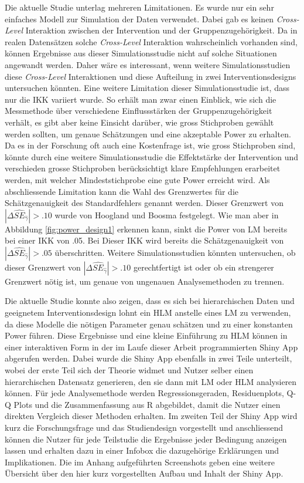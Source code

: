 \documentclass[12pt]{article}\usepackage[]{graphicx}\usepackage[]{color}
\begin{document}
Die aktuelle Studie unterlag mehreren Limitationen. Es wurde nur ein sehr einfaches Modell zur Simulation der Daten verwendet. Dabei gab es keinen \textit{Cross-Level} Interaktion zwischen der Intervention und der Gruppenzugehörigkeit. Da in realen Datensätzen solche \textit{Cross-Level} Interaktion wahrscheinlich vorhanden sind, können Ergebnisse aus dieser Simulationsstudie nicht auf solche Situationen angewandt werden. Daher wäre es interessant, wenn weitere Simulationsstudien diese \textit{Cross-Level} Interaktionen und diese Aufteilung in zwei Interventionsdesigns untersuchen könnten. Eine weitere Limitation dieser Simulationsstudie ist, dass nur die IKK variiert wurde. So erhält man zwar einen Einblick, wie sich die Messmethode über verschiedene Einflussstärken der Gruppenzugehörigkeit verhält, es gibt aber keine Einsicht darüber, wie gross Stichproben gewählt werden sollten, um genaue Schätzungen und eine akzeptable Power zu erhalten. Da es in der Forschung oft auch eine Kostenfrage ist, wie gross Stichproben sind, könnte durch eine weitere Simulationsstudie die Effektstärke der Intervention und verschieden grosse Stichproben berücksichtigt klare Empfehlungen erarbeitet werden, mit welcher Mindeststichprobe eine gute Power erreicht wird. Als abschliessende Limitation kann die Wahl des Grenzwertes für die Schätzgenauigkeit des Standardfehlers genannt werden. Dieser Grenzwert von $|\Delta\widehat{SE}_{\widehat{\gamma}}| > .10$ wurde von Hoogland und Boosma \citeyearpar{hooglandboosma1998robustness} festgelegt. Wie man aber in Abbildung \ref{fig:power_design1} erkennen kann, sinkt die Power von LM bereits bei einer IKK von .05. Bei Dieser IKK wird bereits die Schätzgenauigkeit von $|\Delta\widehat{SE}_{\widehat{\gamma}}| > .05$ überschritten. Weitere Simulationsstudien könnten untersuchen, ob dieser Grenzwert von $|\Delta\widehat{SE}_{\widehat{\gamma}}| > .10$ gerechtfertigt ist oder ob ein strengerer Grenzwert nötig ist, um genaue von ungenauen Analysemethoden zu trennen.

Die aktuelle Studie konnte also zeigen, dass es sich bei hierarchischen Daten und geeignetem Interventionsdesign lohnt ein HLM anstelle eines LM zu verwenden, da diese Modelle die nötigen Parameter genau schätzen und zu einer konstanten Power führen. Diese Ergebnisse und eine kleine Einführung zu HLM können in einer interaktiven Form in der im Laufe dieser Arbeit programmierten Shiny App abgerufen werden. Dabei wurde die Shiny App ebenfalls in zwei Teile unterteilt, wobei der erste Teil sich der Theorie widmet und Nutzer selber einen hierarchischen Datensatz generieren, den sie dann mit LM oder HLM analysieren können. Für jede Analysemethode werden Regressionsgeraden, Residuenplots, Q-Q Plots und die Zusammenfassung aus R abgebildet, damit die Nutzer einen direkten Vergleich dieser Methoden erhalten. Im zweiten Teil der Shiny App wird kurz die Forschungsfrage und das Studiendesign vorgestellt und anschliessend können die Nutzer für jede Teilstudie die Ergebnisse jeder Bedingung anzeigen lassen und erhalten dazu in einer Infobox die dazugehörige Erklärungen und Implikationen. Die im Anhang aufgeführten Screenshots geben eine weitere Übersicht über den hier kurz vorgestellten Aufbau und Inhalt der Shiny App.
\end{document}
